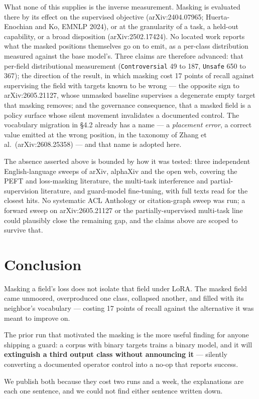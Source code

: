 \documentclass[10pt]{article}
\begin{document}
What none of this supplies is the inverse measurement. Masking is evaluated there by its effect on
the supervised objective (arXiv:2404.07965; Huerta-Enochian and Ko, EMNLP 2024), or at the
granularity of a task, a held-out capability, or a broad disposition (arXiv:2502.17424). No located
work reports what the masked positions themselves go on to emit, as a per-class distribution measured
against the base model's. Three claims are therefore advanced: that per-field
distributional measurement (\texttt{Controversial} 49 to 187, \texttt{Unsafe} 650 to 367); the direction of the
result, in which masking cost 17 points of recall against supervising the field with targets known to
be wrong --- the opposite sign to arXiv:2605.21127, whose unmasked baseline supervises a degenerate
empty target that masking removes; and the governance consequence, that a masked field is a policy
surface whose silent movement invalidates a documented control. The vocabulary migration in §4.2
already has a name --- a \emph{placement error}, a correct value emitted at the wrong position, in the
taxonomy of Zhang et al.~(arXiv:2608.25358) --- and that name is adopted here.

The absence asserted above is bounded by how it was tested: three independent English-language sweeps
of arXiv, alphaXiv and the open web, covering the PEFT and loss-masking literature, the multi-task
interference and partial-supervision literature, and guard-model fine-tuning, with full texts read
for the closest hits. No systematic ACL Anthology or citation-graph sweep was run; a forward sweep on
arXiv:2605.21127 or the partially-supervised multi-task line could plausibly close the remaining gap,
and the claims above are scoped to survive that.



\section{Conclusion}

Masking a field's loss does not isolate that field under LoRA. The masked field came unmoored,
overproduced one class, collapsed another, and filled with its neighbor's vocabulary --- costing 17
points of recall against the alternative it was meant to improve on.

The prior run that motivated the masking is the more useful finding for anyone shipping a guard: a
corpus with binary targets trains a binary model, and it will \textbf{extinguish a third output class
without announcing it} --- silently converting a documented operator control into a no-op that reports
success.

We publish both because they cost two runs and a week, the explanations are each one sentence, and we
could not find either sentence written down.
\end{document}
